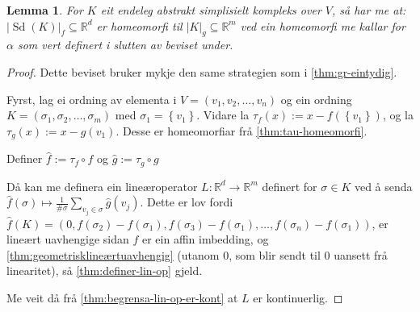 \documentclass[a4paper, 12pt, norsk]{article}
\theoremstyle{plain}
\newtheorem{lemma}[theorem]{Lemma}
\theoremstyle{definition}
\newcommand{\Rb}{\mathbb{R}}
\newcommand{\gr}[1]{ \lvert #1 \rvert } %
\newcommand{\set}[1]{ \left \{ #1 \right \} } %
\DeclareMathOperator{\Sd}{Sd}
\begin{document}
\begin{lemma} \label{thm:alpha-homeomorfi}
	For \( K \) eit endeleg abstrakt simplisielt kompleks over \( V \), så har me at:
	\( \gr{\Sd(K)}_f \subseteq \Rb^d \) er homeomorfi til \( \gr{K}_g \subseteq \Rb^m \) ved ein homeomorfi me kallar for \( \alpha \) som vert definert i slutten av beviset under.
\end{lemma}

\begin{proof} %
	Dette beviset bruker mykje den same strategien som i \autoref{thm:gr-eintydig}.

	Fyrst, lag ei ordning av elementa i \( V = (v_1, v_2, \dots, v_n) \) og ein ordning \( K = (\sigma_1, \sigma_2, \dots, \sigma_m) \) med \( \sigma_1 = \set{v_1} \). Vidare la \( \tau_f(x) := x-f(\set{v_1}) \), og la \( \tau_g(x) := x-g(v_1) \). Desse er homeomorfiar frå \autoref{thm:tau-homeomorfi}.

	Definer \( \hat{f} := \tau_f \circ f \) og \( \hat{g} := \tau_g \circ g \)

	Då kan me definera ein lineæroperator \( L: \Rb^d \to \Rb^m \) definert for \( \sigma \in K \) ved å senda \( \hat{f}(\sigma) \mapsto \frac{1}{\#\sigma}\sum_{v_j \in \sigma} \hat{g}(v_j) \). Dette er lov fordi \( \hat{f}(K) = (0, f(\sigma_2)-f(\sigma_1), f(\sigma_3)-f(\sigma_1), \dots, f(\sigma_n)-f(\sigma_1) ) \), er lineært uavhengige sidan \( f \) er ein affin imbedding, og \autoref{thm:geometrisklineærtuavhengig} (utanom \( 0 \), som blir sendt til \( 0 \) uansett frå linearitet), så \autoref{thm:definer-lin-op} gjeld.

	Me veit då frå \autoref{thm:begrensa-lin-op-er-kont} at \( L \) er kontinuerlig. 


\end{proof}
\end{document}
